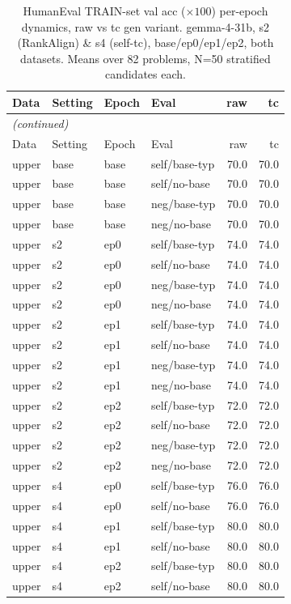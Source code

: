 {\small
\begin{longtable}{llll rr}
\caption{HumanEval TRAIN-set val acc ($\times100$) per-epoch dynamics, raw vs tc gen variant. gemma-4-31b, s2 (RankAlign) \& s4 (self-tc), base/ep0/ep1/ep2, both datasets. Means over 82 problems, N=50 stratified candidates each.}\label{tab:he_train_val_acc}\\
\toprule
Data & Setting & Epoch & Eval & raw & tc \\
\midrule
\endfirsthead
\multicolumn{6}{l}{\itshape (continued)}\\
\toprule
Data & Setting & Epoch & Eval & raw & tc \\
\midrule
\endhead
\bottomrule
\endfoot
upper & base & base & self/base-typ & 70.0 & 70.0 \\
upper & base & base & self/no-base & 70.0 & 70.0 \\
upper & base & base & neg/base-typ & 70.0 & 70.0 \\
upper & base & base & neg/no-base & 70.0 & 70.0 \\
upper & s2 & ep0 & self/base-typ & 74.0 & 74.0 \\
upper & s2 & ep0 & self/no-base & 74.0 & 74.0 \\
upper & s2 & ep0 & neg/base-typ & 74.0 & 74.0 \\
upper & s2 & ep0 & neg/no-base & 74.0 & 74.0 \\
upper & s2 & ep1 & self/base-typ & 74.0 & 74.0 \\
upper & s2 & ep1 & self/no-base & 74.0 & 74.0 \\
upper & s2 & ep1 & neg/base-typ & 74.0 & 74.0 \\
upper & s2 & ep1 & neg/no-base & 74.0 & 74.0 \\
upper & s2 & ep2 & self/base-typ & 72.0 & 72.0 \\
upper & s2 & ep2 & self/no-base & 72.0 & 72.0 \\
upper & s2 & ep2 & neg/base-typ & 72.0 & 72.0 \\
upper & s2 & ep2 & neg/no-base & 72.0 & 72.0 \\
upper & s4 & ep0 & self/base-typ & 76.0 & 76.0 \\
upper & s4 & ep0 & self/no-base & 76.0 & 76.0 \\
upper & s4 & ep1 & self/base-typ & 80.0 & 80.0 \\
upper & s4 & ep1 & self/no-base & 80.0 & 80.0 \\
upper & s4 & ep2 & self/base-typ & 80.0 & 80.0 \\
upper & s4 & ep2 & self/no-base & 80.0 & 80.0 \\

\end{longtable}}
